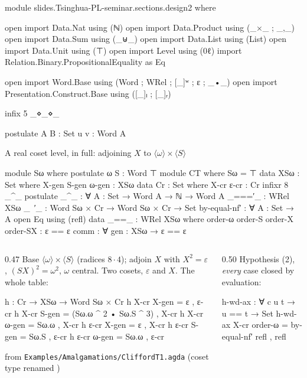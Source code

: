 \begin{code}[hide]
module slides.Tsinghua-PL-seminar.sections.design2 where

open import Data.Nat using (ℕ)
open import Data.Product using (_×_ ; _,_)
open import Data.Sum using (_⊎_)
open import Data.List using (List)
open import Data.Unit using (⊤)
open import Level using (0ℓ)
import Relation.Binary.PropositionalEquality as Eq

open import Word.Base using (Word ; WRel ; [_]ʷ ; ε ; _•_)
open import Presentation.Construct.Base using ([_]ₗ ; [_]ᵣ)

infix 5 _⋄_⋄_

postulate
  A B : Set
  u v : Word A
\end{code}
\begin{frame}{A real coset level, in full: adjoining $X$ to $\langle\omega\rangle\times\langle S\rangle$ \InPaper}
\begin{code}[hide]
module Sω where
  postulate ω S : Word ⊤
module CT where
  Sω = ⊤
  data XSω : Set where
    X-gen S-gen ω-gen : XSω
  data Cr : Set where
    X-cr ε-cr : Cr
  infixr 8 _^_
  postulate
    _^_ : ∀ {A : Set} → Word A → ℕ → Word A
    _===′_ : WRel XSω
    _~′_ : Word Sω × Cr → Word Sω × Cr → Set
    by-equal-nf′ : ∀ {A : Set} → A
  open Eq using (refl)
  data _==_ : WRel XSω where
    order-ω order-S order-X order-SX : ε == ε
    comm : ∀ {gen : XSω} → ε == ε
\end{code}
\begin{columns}[T]
\begin{column}{0.47\textwidth}
\small Base $\langle\omega\rangle\times\langle S\rangle$ (radices $8\cdot 4$);
adjoin $X$ with $X^2=\varepsilon$, $(SX)^2=\omega^2$, $\omega$ central.
Two cosets, $\varepsilon$ and $X$. The whole table:
\begin{code}
  h : Cr → XSω → Word Sω × Cr
  h X-cr X-gen = ε , ε-cr
  h X-cr S-gen = (Sω.ω ^ 2 • Sω.S ^ 3) , X-cr
  h X-cr ω-gen = Sω.ω , X-cr
  h ε-cr X-gen = ε , X-cr
  h ε-cr S-gen = Sω.S , ε-cr
  h ε-cr ω-gen = Sω.ω , ε-cr
\end{code}
{\scriptsize from \texttt{Examples/Amalgamations/CliffordT1.agda} (coset type renamed )}
\end{column}
\begin{column}{0.50\textwidth}
\small Hypothesis (2), \emph{every} case closed by evaluation:
\begin{code}
  h-wd-ax : ∀ c {u t} → u == t → Set
  h-wd-ax X-cr order-ω = by-equal-nf′ refl , refl

\end{code}
\end{column}
\end{columns}
\end{frame}
